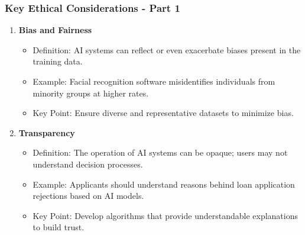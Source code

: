 \documentclass[aspectratio=169]{beamer}
\begin{document}
\begin{frame}[fragile]
    \frametitle{Key Ethical Considerations - Part 1}
    \begin{enumerate}
        \item \textbf{Bias and Fairness}
            \begin{itemize}
                \item Definition: AI systems can reflect or even exacerbate biases present in the training data.
                \item Example: Facial recognition software misidentifies individuals from minority groups at higher rates.
                \item Key Point: Ensure diverse and representative datasets to minimize bias.
            \end{itemize}

        \item \textbf{Transparency}
            \begin{itemize}
                \item Definition: The operation of AI systems can be opaque; users may not understand decision processes.
                \item Example: Applicants should understand reasons behind loan application rejections based on AI models.
                \item Key Point: Develop algorithms that provide understandable explanations to build trust.
            \end{itemize}
    \end{enumerate}
\end{frame}
\end{document}
